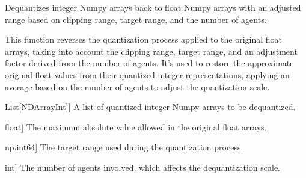 \documentclass[letterpaper,10pt,english]{sphinxmanual}
\begin{document}

\begin{fulllineitems}
\label{\detokenize{utils_quantisation:utils_quantisation.dequantize_mean}}
\pysigstartsignatures
{}
\pysigstopsignatures
\sphinxAtStartPar
Dequantizes integer Numpy arrays back to float Numpy arrays with an adjusted range based on
clipping range, target range, and the number of agents.

\sphinxAtStartPar
This function reverses the quantization process applied to the original float arrays, taking into account
the clipping range, target range, and an adjustment factor derived from the number of agents. It’s used
to restore the approximate original float values from their quantized integer representations, applying
an average based on the number of agents to adjust the quantization scale.
\begin{description}
\begin{description}
\sphinxlineitem{quantized\_parameters}{[}List{[}NDArrayInt{]}{]}
\sphinxAtStartPar
A list of quantized integer Numpy arrays to be dequantized.

\sphinxlineitem{clipping\_range}{[}float{]}
\sphinxAtStartPar
The maximum absolute value allowed in the original float arrays.

\sphinxlineitem{target\_range}{[}np.int64{]}
\sphinxAtStartPar
The target range used during the quantization process.

\sphinxlineitem{ag\_no}{[}int{]}
\sphinxAtStartPar
The number of agents involved, which affects the dequantization scale.


\end{description}
\end{description}
\end{fulllineitems}
\end{document}
